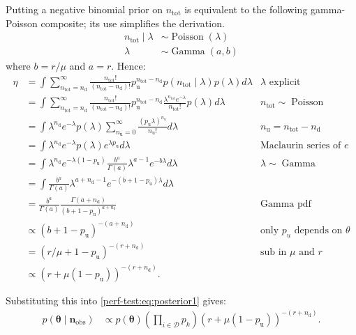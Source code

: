 \documentclass[12pt]{article}
\def\dist{\sim}
\DeclareMathOperator{\Poi}{Poisson}
\DeclareMathOperator{\GamDist}{Gamma}
\newcommand\set{\mathcal}
\renewcommand{\vec}[1]{\bm{#1}}
\newcommand{\ntot}{n_\text{tot}}
\newcommand{\ndet}{n_\text{d}}
\newcommand{\nnodet}{n_\text{u}}
\newcommand{\pnodet}{p_\text{u}}
\newcommand{\na}{\vec{n}_\text{obs}}
\begin{document}
Putting a negative binomial prior on $\ntot$ is equivalent to the following gamma-Poisson composite; its use simplifies the derivation.
\begin{align}
\ntot \mid \lambda &\dist \Poi(\lambda) \\
\lambda &\dist \GamDist(a, b)
\end{align}
where $b = r / \mu$ and $a = r$.
Hence:
\begin{align}
\eta
&= \int \sum_{\ntot=\ndet}^\infty \frac{\ntot!}{(\ntot-\ndet)!} \pnodet^{\ntot-\ndet} p(\ntot \mid \lambda) p(\lambda) d\lambda &\text{$\lambda$ explicit}\\
&= \int \sum_{\ntot=\ndet}^\infty \frac{\ntot!}{(\ntot-\ndet)!} \pnodet^{\ntot-\ndet} \frac{\lambda^{\ntot} e^{-\lambda}}{\ntot!} p(\lambda) d\lambda &\ntot \dist \Poi\\
&= \int \lambda^{\ndet} e^{-\lambda} p(\lambda) \sum_{\nnodet=0}^\infty \frac{(\pnodet \lambda)^{\nnodet}}{\nnodet!} d\lambda &\nnodet = \ntot-\ndet\\
&= \int \lambda^{\ndet} e^{-\lambda} p(\lambda) e^{\lambda \pnodet} d\lambda &\text{Maclaurin series of $e$} \\
&= \int \lambda^{\ndet} e^{-\lambda(1 - \pnodet)} \frac{b^a}{\Gamma(a)} \lambda^{a-1} e^{-b\lambda} d\lambda &\lambda \dist \GamDist\\
&= \int \frac{b^a}{\Gamma(a)} \lambda^{a+\ndet-1} e^{-(b+1-\pnodet)\lambda} d\lambda \\
&= \frac{b^a}{\Gamma(a)} \frac{\Gamma(a+\ndet)}{(b+1-\pnodet)^{a+\ndet}} &\text{Gamma pdf}\\
&\propto (b+1-\pnodet)^{-(a+\ndet)} &\text{only $p_u$ depends on $\theta$}\\
&= (r/\mu + 1 - \pnodet)^{-(r+\ndet)} &\text{sub in $\mu$ and $r$}\\
&\propto(r + \mu (1- \pnodet))^{-(r+\ndet)}.
\end{align}

Substituting this into \cref{perf-test:eq:posterior1} gives:
\begin{align}
p(\vec{\theta} \mid \na)
&\propto p(\vec{\theta}) \left( \prod_{i \in \set{D}} p_k \right) (r + \mu (1- \pnodet))^{-(r+\ndet)}.
\end{align}
\end{document}
